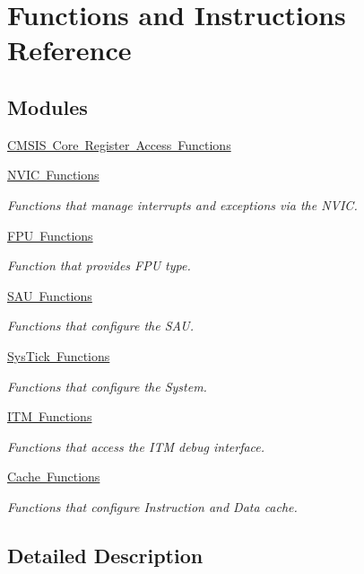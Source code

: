 \hypertarget{group___c_m_s_i_s___core___function_interface}{}\section{Functions and Instructions Reference}
\label{group___c_m_s_i_s___core___function_interface}
\subsection*{Modules}
\begin{DoxyCompactItemize}
\item 
\mbox{\hyperlink{group___c_m_s_i_s___core___reg_acc_functions}{C\+M\+S\+I\+S Core Register Access Functions}}
\item 
\mbox{\hyperlink{group___c_m_s_i_s___core___n_v_i_c_functions}{N\+V\+I\+C Functions}}
\begin{DoxyCompactList}\small\item\em Functions that manage interrupts and exceptions via the N\+V\+IC. \end{DoxyCompactList}\item 
\mbox{\hyperlink{group___c_m_s_i_s___core___fpu_functions}{F\+P\+U Functions}}
\begin{DoxyCompactList}\small\item\em Function that provides F\+PU type. \end{DoxyCompactList}\item 
\mbox{\hyperlink{group___c_m_s_i_s___core___s_a_u_functions}{S\+A\+U Functions}}
\begin{DoxyCompactList}\small\item\em Functions that configure the S\+AU. \end{DoxyCompactList}\item 
\mbox{\hyperlink{group___c_m_s_i_s___core___sys_tick_functions}{Sys\+Tick Functions}}
\begin{DoxyCompactList}\small\item\em Functions that configure the System. \end{DoxyCompactList}\item 
\mbox{\hyperlink{group___c_m_s_i_s__core___debug_functions}{I\+T\+M Functions}}
\begin{DoxyCompactList}\small\item\em Functions that access the I\+TM debug interface. \end{DoxyCompactList}\item 
\mbox{\hyperlink{group___c_m_s_i_s___core___cache_functions}{Cache Functions}}
\begin{DoxyCompactList}\small\item\em Functions that configure Instruction and Data cache. \end{DoxyCompactList}\end{DoxyCompactItemize}


\subsection{Detailed Description}
